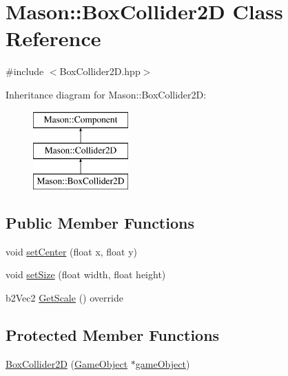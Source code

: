 \hypertarget{class_mason_1_1_box_collider2_d}{}\section{Mason\+:\+:Box\+Collider2D Class Reference}
\label{class_mason_1_1_box_collider2_d}


{\ttfamily \#include $<$Box\+Collider2\+D.\+hpp$>$}

Inheritance diagram for Mason\+:\+:Box\+Collider2D\+:\begin{figure}[H]
\begin{center}
\leavevmode
\includegraphics[height=3.000000cm]{class_mason_1_1_box_collider2_d}
\end{center}
\end{figure}
\subsection*{Public Member Functions}
\begin{DoxyCompactItemize}
\item 
void \hyperlink{class_mason_1_1_box_collider2_d_aa2c5bb9d3f7e0c64f8784dce237676b4}{set\+Center} (float x, float y)
\item 
void \hyperlink{class_mason_1_1_box_collider2_d_af6ee6df0351c4a59b344a274626b032d}{set\+Size} (float width, float height)
\item 
b2\+Vec2 \hyperlink{class_mason_1_1_box_collider2_d_a396aa615690a67c855b5025e3a1b3bce}{Get\+Scale} () override
\end{DoxyCompactItemize}
\subsection*{Protected Member Functions}
\begin{DoxyCompactItemize}
\item 
\hyperlink{class_mason_1_1_box_collider2_d_ab74dd3e9b390bd7580e0137503000ac1}{Box\+Collider2D} (\hyperlink{class_mason_1_1_game_object}{Game\+Object} $\ast$\hyperlink{class_mason_1_1_component_a30030370c35f5562cbbbb0927b0448c8}{game\+Object})
\end{DoxyCompactItemize}
